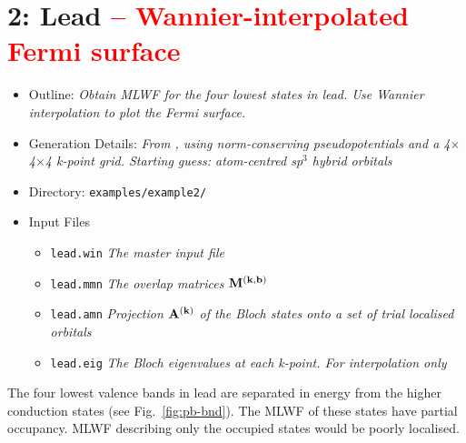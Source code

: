 \documentclass[a4paper,11pt,twoside]{article}
\def\tent#1{\textcolor{red}{#1}}     %
\begin{document}
\cleardoublepage



\section*{2: Lead \tent{-- Wannier-interpolated Fermi surface}}

\begin{itemize}
\item{Outline: \it{Obtain MLWF for the four lowest states
    in lead. Use Wannier interpolation to plot the Fermi surface.}}
\item{Generation Details: \it{From \pwscf, using norm-conserving
    pseudopotentials and a 4$\times$4$\times$4 k-point grid. Starting
    guess: atom-centred sp$^3$ hybrid orbitals}} 
\item{Directory: {\tt examples/example2/}}
\item{Input Files}
\begin{itemize}
\item{ {\tt lead.win}  {\it The master input file}}
\item{ {\tt lead.mmn}  {\it The overlap matrices $\mathbf{M}^{(\mathbf{k},\mathbf{b})}$}}
\item{ {\tt lead.amn}  {\it Projection $\mathbf{A}^{(\mathbf{k})}$ of the Bloch states onto a set
    of trial localised orbitals}} 
\item{ {\tt lead.eig}  {\it The Bloch eigenvalues at each k-point. For
    interpolation only}} 
\end{itemize}

\end{itemize}
The four lowest valence bands in lead are separated in energy from the
higher conduction states (see Fig.~\ref{fig:pb-bnd}). The MLWF of
these states have partial occupancy. MLWF describing only the occupied
states would be poorly localised.
\end{document}
